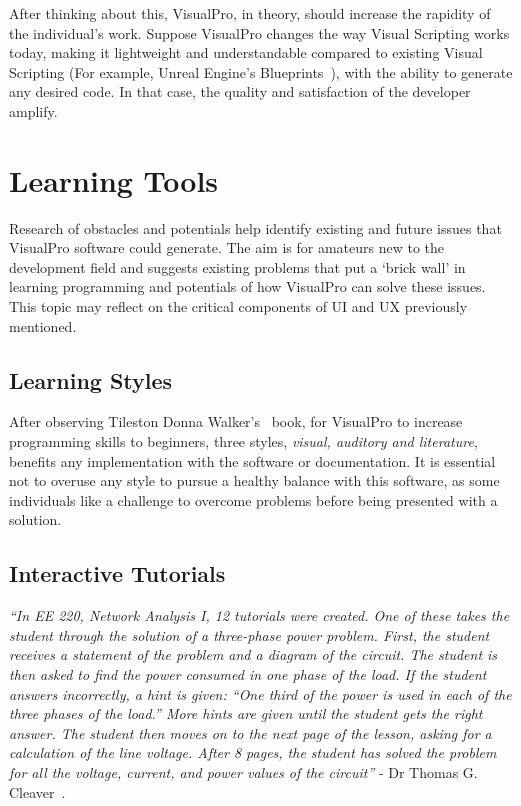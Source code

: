 \documentclass[12pt]{report} %
\begin{document}
		After thinking about this, VisualPro, in theory, should increase the rapidity of the individual's work. Suppose VisualPro changes the way Visual Scripting works today, making it lightweight and understandable compared to existing Visual Scripting (For example, Unreal Engine's Blueprints~\cite{unreal_engine_introduction_nodate}), with the ability to generate any desired code. In that case, the quality and satisfaction of the developer amplify.

	\section{Learning Tools}
		Research of obstacles and potentials help identify existing and future issues that VisualPro software could generate. The aim is for amateurs new to the development field and suggests existing problems that put a `brick wall' in learning programming and potentials of how VisualPro can solve these issues. This topic may reflect on the critical components of UI and UX previously mentioned.

		\subsection{Learning Styles}
			After observing Tileston Donna Walker's~\cite{tileston_donna_walker_10_2011} book, for VisualPro to increase programming skills to beginners, three styles, \textit{visual, auditory and literature}, benefits any implementation with the software or documentation. It is essential not to overuse any style to pursue a healthy balance with this software, as some individuals like a challenge to overcome problems before being presented with a solution. 

		\subsection{Interactive Tutorials}
			\begin{center}
				\textit{``In EE 220, Network Analysis I, 12 tutorials were created. One of these takes the student through the solution of a three-phase power problem. First, the student receives a statement of the problem and a diagram of the circuit. The student is then asked to find the power consumed in one phase of the load. If the student answers incorrectly, a hint is given: “One third of the power is used in each of the three phases of the load.” More hints are given until the student gets the right answer. The student then moves on to the next page of the lesson, asking for a calculation of the line voltage. After 8 pages, the student has solved the	problem for all the voltage, current, and power values of the circuit''} - Dr Thomas G. Cleaver~\cite{cleaver_interactive_1999}.
			\end{center}
\end{document}
